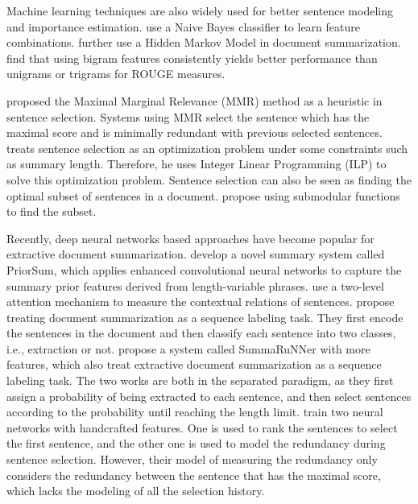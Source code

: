 \documentclass[11pt,a4paper]{article}
\begin{document}
Machine learning techniques are also widely used for better sentence modeling and importance estimation.
\citet{kupiec1995trainable} use a Naive Bayes classifier to learn feature combinations.
\citet{conroy2001text} further use a Hidden Markov Model in document summarization.
\citet{gillick2009scalable} find that using bigram features consistently yields better performance than unigrams or trigrams
for ROUGE \cite{lin2004rouge} measures.

\citet{carbonell1998use} proposed the Maximal Marginal Relevance (MMR) method as a heuristic in sentence selection.
Systems using MMR select the sentence which has the maximal score and is minimally redundant with previous selected sentences.
\citet{mcdonald2007study} treats sentence selection as an optimization problem under some constraints such as summary length.
Therefore, he uses Integer Linear Programming (ILP) to solve this optimization problem.
Sentence selection can also be seen as finding the optimal subset of sentences in a document.
\citet{lin2011class} propose using submodular functions to find the subset.



Recently, deep neural networks based approaches have become popular for extractive document summarization.
\citet{cao2015learning} develop a novel summary system called PriorSum, which applies  enhanced convolutional neural networks to capture the summary prior features derived from length-variable phrases.
\citet{Ren:2017:LCS:3077136.3080792} use a two-level attention mechanism to measure the contextual relations of sentences.
\citet{cheng-lapata:2016:P16-1} propose  treating document summarization as a sequence labeling task.
They first encode the sentences in the document and then classify each sentence into two classes, i.e., extraction or not.
\citet{nallapati2017summarunner} propose a system called SummaRuNNer with more features, which also treat extractive document summarization as a sequence labeling task.
The two works are both in the separated paradigm, as they first assign a probability of being extracted to each sentence, and then select sentences according to the probability  until reaching the length limit. 
\citet{ren2016redundancy} train two neural networks with handcrafted features. One is used to rank the sentences to select the first sentence, and the other one is used to model the redundancy during sentence selection.
However, their model of measuring the redundancy only considers the redundancy between the sentence that has the maximal score, which lacks the modeling of all the selection history. 
\end{document}
